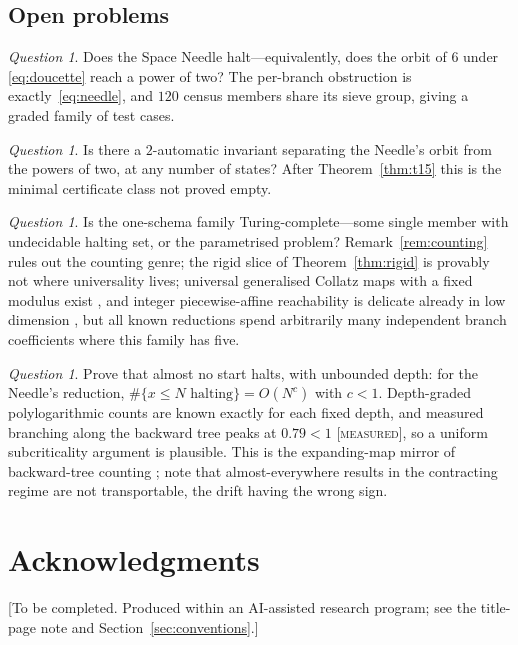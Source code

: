 \documentclass[11pt]{article}
\theoremstyle{definition}
\theoremstyle{remark}
\newtheorem{question}[theorem]{Question}
\newcommand{\Meas}{\textsc{[measured]}}
\begin{document}
\subsection{Open problems}

\begin{question}
Does the Space Needle halt---equivalently, does the orbit of $6$ under
\eqref{eq:doucette} reach a power of two?  The per-branch obstruction is
exactly~\eqref{eq:needle}, and $120$ census members share its sieve group,
giving a graded family of test cases.
\end{question}

\begin{question}
Is there a $2$-automatic invariant separating the Needle's orbit from the
powers of two, at any number of states?  After Theorem~\ref{thm:t15} this is
the minimal certificate class not proved empty.
\end{question}

\begin{question}
Is the one-schema family Turing-complete---some single member with undecidable
halting set, or the parametrised problem?  Remark~\ref{rem:counting} rules out
the counting genre; the rigid slice of Theorem~\ref{thm:rigid} is provably not
where universality lives; universal generalised Collatz maps with a fixed
modulus exist \cite{kascak}, and integer piecewise-affine reachability is
delicate already in low dimension \cite{ben-amram}, but all known reductions
spend arbitrarily many independent branch coefficients where this family has
five.
\end{question}

\begin{question}
Prove that almost no start halts, with unbounded depth: for the Needle's
reduction, $\#\{x\le N \text{ halting}\}=O(N^{c})$ with $c<1$.  Depth-graded
polylogarithmic counts are known exactly for each fixed depth, and measured
branching along the backward tree peaks at $0.79<1$ \Meas{}, so a uniform
subcriticality argument is plausible.  This is the expanding-map mirror of
backward-tree counting \cite{krasikov-lagarias,kontorovich-lagarias}; note that
almost-everywhere results in the contracting regime \cite{tao} are not
transportable, the drift having the wrong sign.
\end{question}

\section*{Acknowledgments}
[To be completed.  Produced within an AI-assisted research program; see the
title-page note and Section~\ref{sec:conventions}.]
\end{document}
